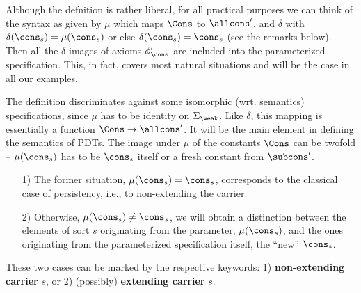 Although the defnition is rather liberal, for all practical purposes we can
think of the syntax as given by $\mu$ which maps $\Cons$ to ${\allcons}'$,
and $\delta$ with
$\delta(\cons_s)=\mu(\cons_s)$ or else
$\delta(\cons_s)=\cons_s$ (see the remarks below).
Then all the $\delta$-images of axioms $\phi'_\cons$ are included into the parameterized
specification. This, in fact, covers most natural situations and
will be the case in all our examples.

The definition discriminates against some
isomorphic (wrt. semantics)
specifications, since $\mu$ has to be identity on
$\Sigma_\weak$. Like $\delta$, this mapping is essentially a function
$\Cons\to{\allcons}'$.
It will be the main element in defining the
semantics of PDTs.
The image
under $\mu$ of the constants $\Cons$ can be twofold -- 
$\mu(\cons_s)$ has to be $\cons_s$ itself or a
fresh constant from ${\subcons}'$.  
\begin{itemize}\MyLPar
\item[1)] The former situation, $\mu(\cons_s)=\cons_s$, corresponds to the
classical case of persistency, i.e., to  non-extending the carrier.
\item[2)] Otherwise, $\mu(\cons_s)\not=\cons_s$, we
will obtain a distinction between the elements of sort $s$ originating from
the parameter, $\mu(\cons_s)$, and the ones originating from the parameterized specification
itself, the ``new'' $\cons_s$. 
\end{itemize}
These two cases can be marked by the respective keywords: 1) {\bf
non-extending carrier} $s$, or 2) (possibly) {\bf extending carrier} $s$.

